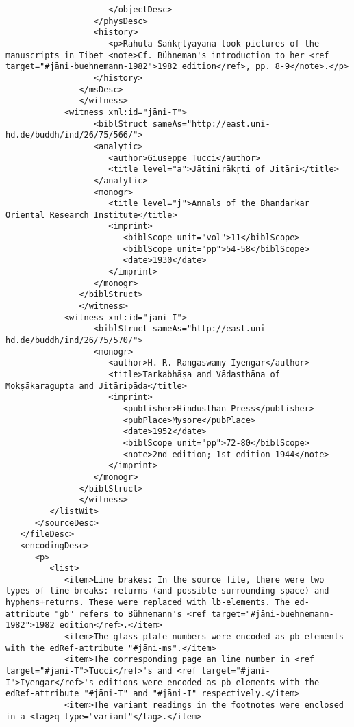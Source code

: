 \documentclass[article,12pt,a4paper]{memoir}%
\begin{document}
\begin{verbatim}
                     </objectDesc>
                  </physDesc>
                  <history>
                     <p>Rāhula Sāṅkṛtyāyana took pictures of the manuscripts in Tibet <note>Cf. Bühneman's introduction to her <ref target="#jāni-buehnemann-1982">1982 edition</ref>, pp. 8-9</note>.</p>
                  </history>
               </msDesc>
	           </witness>
            <witness xml:id="jāni-T">
	              <biblStruct sameAs="http://east.uni-hd.de/buddh/ind/26/75/566/">
                  <analytic>
                     <author>Giuseppe Tucci</author>
                     <title level="a">Jātinirākṛti of Jitāri</title>
                  </analytic>
                  <monogr>
                     <title level="j">Annals of the Bhandarkar Oriental Research Institute</title>
                     <imprint>
                        <biblScope unit="vol">11</biblScope>
                        <biblScope unit="pp">54-58</biblScope>
                        <date>1930</date>
                     </imprint>
                  </monogr>
               </biblStruct>
	           </witness>
            <witness xml:id="jāni-I">
	              <biblStruct sameAs="http://east.uni-hd.de/buddh/ind/26/75/570/">
                  <monogr>
                     <author>H. R. Rangaswamy Iyengar</author>
                     <title>Tarkabhāṣa and Vādasthāna of Mokṣākaragupta and Jitāripāda</title>
                     <imprint>
                        <publisher>Hindusthan Press</publisher>
                        <pubPlace>Mysore</pubPlace>
                        <date>1952</date>
                        <biblScope unit="pp">72-80</biblScope>
                        <note>2nd edition; 1st edition 1944</note>
                     </imprint>
                  </monogr>
               </biblStruct>
	           </witness>
         </listWit>
      </sourceDesc>
   </fileDesc>
   <encodingDesc>
      <p>
         <list>
            <item>Line brakes: In the source file, there were two types of line breaks: returns (and possible surrounding space) and hyphens+returns. These were replaced with lb-elements. The ed-attribute "gb" refers to Bühnemann's <ref target="#jāni-buehnemann-1982">1982 edition</ref>.</item>
            <item>The glass plate numbers were encoded as pb-elements with the edRef-attribute "#jāni-ms".</item>
            <item>The corresponding page an line number in <ref target="#jāni-T">Tucci</ref>'s and <ref target="#jāni-I">Iyengar</ref>'s editions were encoded as pb-elements with the edRef-attribute "#jāni-T" and "#jāni-I" respectively.</item>
            <item>The variant readings in the footnotes were enclosed in a <tag>q type="variant"</tag>.</item>

\end{verbatim}
\end{document}
